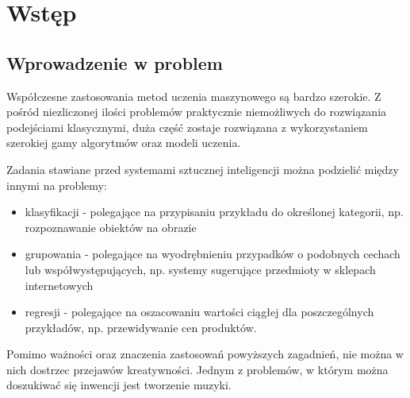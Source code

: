
\chapter{Wstęp}
{



 \section{Wprowadzenie w problem}
 {
    Współczesne zastosowania metod uczenia maszynowego są bardzo szerokie.
    Z pośród niezliczonej ilości problemów praktycznie niemożliwych do rozwiązania podejściami klasycznymi, 
    duża część zostaje rozwiązana z wykorzystaniem szerokiej gamy algorytmów oraz modeli uczenia.
     
    Zadania stawiane przed systemami sztucznej inteligencji można podzielić między innymi na problemy:
    \begin{itemize}
        \item klasyfikacji - polegające na przypisaniu przykładu do określonej kategorii, 
        np. rozpoznawanie obiektów na obrazie 
        \item grupowania - polegające na wyodrębnieniu przypadków o podobnych cechach 
        lub współwystępujących, np. systemy sugerujące przedmioty w sklepach internetowych
        \item regresji - polegające na oszacowaniu wartości ciągłej dla poszczególnych przykładów, 
        np. przewidywanie cen produktów.
    \end{itemize}

    Pomimo ważności oraz znaczenia zastosowań powyższych zagadnień, 
    nie można w nich dostrzec przejawów kreatywności.
    Jednym z problemów, w którym można doszukiwać się inwencji jest tworzenie muzyki.

}}
